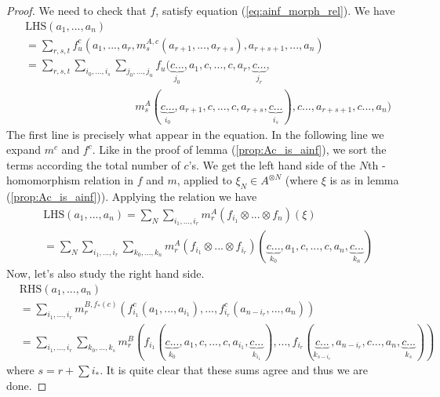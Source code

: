 \begin{proof}
We need to check that $f$, satisfy equation (\ref{eq:ainf_morph_rel}). 
We have
\begin{align*}
& \text{LHS} (a_1,...,a_n) \\
&= \sum_{r,s,t} f^c_u (a_1, ..., a_r, m^{A,c}_s(a_{r+1}, ..., a_{r+s}),
a_{r+s+1}, ..., a_{n}) \\
%
%
&= \sum_{r,s,t} \sum_{i_0,...,i_s}\sum_{j_0,...,j_u} 
f_u \big(\underbrace{c...}_{j_0},a_1,c,...,c, a_r,\underbrace{c...}_{j_r}, \\
& \qquad\qquad\qquad\qquad\qquad 
m^A_s(\underbrace{c...}_{i_0}, a_{r+1}, c,...,c, a_{r+s},\underbrace{c...}_{i_s}),
c..., a_{r+s+1},c..., a_{n} \big) 
\end{align*}
The first line is precisely what appear in the equation. In the following line
we expand $m^c$ and $f^c$. Like in the proof of lemma (\ref{prop:Ac_is_ainf}),
we sort the terms according the total number of $c$'s. We get the left hand
side of the $N$th \Ainf-homomorphism relation in $f$ and $m$, applied to $\xi_N \in
A^{\otimes N}$ (where $\xi$ is as in lemma (\ref{prop:Ac_is_ainf})). Applying
the relation we have
\begin{align*}
& \text{LHS} (a_1,...,a_n) 
= \sum_N \sum_{i_1,...,i_r} m^A_r (f_{i_1} \otimes ... \otimes f_{n}) (\xi) \\
&= \sum_N \sum_{i_1,...,i_r} \sum_{k_0,...,k_n} m^A_r (f_{i_1} \otimes ... \otimes
f_{i_r}) (\underbrace{c...}_{k_0}, a_1, c,...,c, a_n,
\underbrace{c...}_{k_n})
\end{align*}
Now, let's also study the right hand side.
\begin{align*}
&\text{RHS} (a_1,...,a_n) \\
&= \sum_{i_1,...,i_r} m^{B,f_*(c)}_r (f^c_{i_1}(a_1,...,a_{i_1}), ...,
f^c_{i_r}(a_{n-i_r},...,a_n)) \\ 
&= \sum_{i_1,...,i_r}\sum_{k_0,...,k_s} m^B_r
(f_{i_1}(\underbrace{c...}_{k_0},a_1,c,...,c,a_{i_1},\underbrace{c...}_{k_{i_1}}), ...,
f_{i_r}(\underbrace{c...}_{k_{s-i_r}},a_{n-i_r},c...,a_n,\underbrace{c...}_{k_s})) 
\end{align*}
where $s = r + \sum i_*$. It is quite clear that these sums agree and thus we
are done.  
\end{proof}




